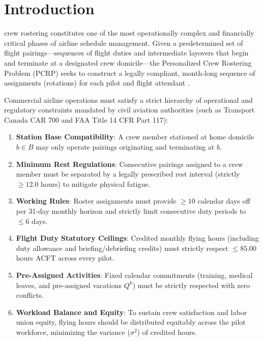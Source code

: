 \documentclass[journal]{IEEEtran}
\begin{document}
\section{Introduction}

 crew rostering constitutes one of the most operationally complex and financially critical phases of airline schedule management. Given a predetermined set of flight pairings---sequences of flight duties and intermediate layovers that begin and terminate at a designated crew domicile---the Personalized Crew Rostering Problem (PCRP) seeks to construct a legally compliant, month-long sequence of assignments (rotations) for each pilot and flight attendant \cite{kasirzadeh2017,kohl2004}. 

Commercial airline operations must satisfy a strict hierarchy of operational and regulatory constraints mandated by civil aviation authorities (such as Transport Canada CAR 700 and FAA Title 14 CFR Part 117):
\begin{enumerate}
    \item \textbf{Station Base Compatibility}: A crew member stationed at home domicile $b \in B$ may only operate pairings originating and terminating at $b$.
    \item \textbf{Minimum Rest Regulations}: Consecutive pairings assigned to a crew member must be separated by a legally prescribed rest interval (strictly $\ge 12.0$ hours) to mitigate physical fatigue.
    \item \textbf{Working Rules}: Roster assignments must provide $\ge 10$ calendar days off per 31-day monthly horizon and strictly limit consecutive duty periods to $\le 6$ days.
    \item \textbf{Flight Duty Statutory Ceilings}: Credited monthly flying hours (including duty allowance and briefing/debriefing credits) must strictly respect $\le 85.00$ hours ACFT across every pilot.
    \item \textbf{Pre-Assigned Activities}: Fixed calendar commitments (training, medical leaves, and pre-assigned vacations $Q^k$) must be strictly respected with zero conflicts.
    \item \textbf{Workload Balance and Equity}: To sustain crew satisfaction and labor union equity, flying hours should be distributed equitably across the pilot workforce, minimizing the variance ($\sigma^2$) of credited hours.
\end{enumerate}
\end{document}
